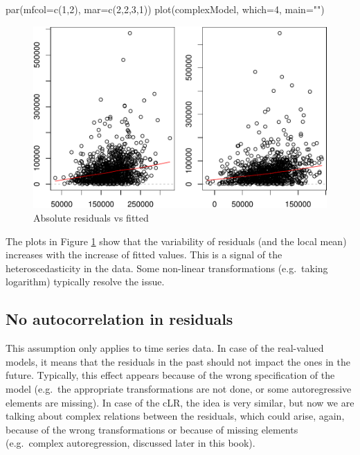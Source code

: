 \documentclass[
]{book}
\newenvironment{Shaded}{\begin{snugshade}}{\end{snugshade}}
\newcommand{\AttributeTok}[1]{\textcolor[rgb]{0.77,0.63,0.00}{#1}}
\newcommand{\DecValTok}[1]{\textcolor[rgb]{0.00,0.00,0.81}{#1}}
\newcommand{\FunctionTok}[1]{\textcolor[rgb]{0.00,0.00,0.00}{#1}}
\newcommand{\NormalTok}[1]{#1}
\newcommand{\StringTok}[1]{\textcolor[rgb]{0.31,0.60,0.02}{#1}}
\begin{document}
\begin{Shaded}
\begin{Highlighting}[]
\FunctionTok{par}\NormalTok{(}\AttributeTok{mfcol=}\FunctionTok{c}\NormalTok{(}\DecValTok{1}\NormalTok{,}\DecValTok{2}\NormalTok{), }\AttributeTok{mar=}\FunctionTok{c}\NormalTok{(}\DecValTok{2}\NormalTok{,}\DecValTok{2}\NormalTok{,}\DecValTok{3}\NormalTok{,}\DecValTok{1}\NormalTok{))}
\FunctionTok{plot}\NormalTok{(complexModel, }\AttributeTok{which=}\DecValTok{4}\NormalTok{, }\AttributeTok{main=}\StringTok{""}\NormalTok{)}
\end{Highlighting}
\end{Shaded}

\begin{figure}
\centering
\includegraphics{Svetunkov---Svetunkov---Complex-Valued-Econometrics_files/figure-latex/heteroDiagnostics-1.pdf}
\caption{\label{fig:heteroDiagnostics}Absolute residuals vs fitted}
\end{figure}

The plots in Figure \ref{fig:heteroDiagnostics} show that the variability of residuals (and the local mean) increases with the increase of fitted values. This is a signal of the heteroscedasticity in the data. Some non-linear transformations (e.g.~taking logarithm) typically resolve the issue.

\hypertarget{assumptionsResidualsAuto}{%
\subsection{No autocorrelation in residuals}\label{assumptionsResidualsAuto}}

This assumption only applies to time series data. In case of the real-valued models, it means that the residuals in the past should not impact the ones in the future. Typically, this effect appears because of the wrong specification of the model (e.g.~the appropriate transformations are not done, or some autoregressive elements are missing). In case of the cLR, the idea is very similar, but now we are talking about complex relations between the residuals, which could arise, again, because of the wrong transformations or because of missing elements (e.g.~complex autoregression, discussed later in this book).
\end{document}

